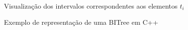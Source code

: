 \begin{frame}[fragile]{Visualização dos intervalos correspondentes aos elementos $t_i$}
\begin{figure}
\begin{tikzpicture}[scale=0.9]
        \end{tikzpicture}

    \end{figure}

\end{frame}

\begin{frame}[fragile]{Exemplo de representação de uma BITree em C++}
\end{frame}
